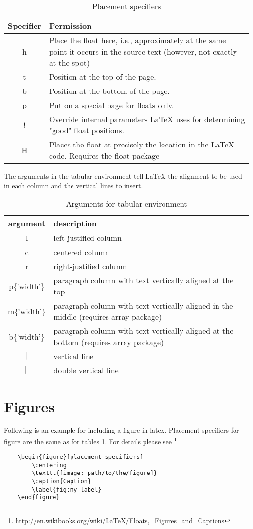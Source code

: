 \begin{table}[h]
\centering
\begin{tabular}{|c|p{6cm}|} \hline
Specifier	& Permission \\ \hline
h	 & Place the float here, i.e., approximately at the same point it  occurs in the source text (however, not exactly at the spot)\\ \hline
t &	Position at the top of the page. \\ \hline
b &	Position at the bottom of the page. \\ \hline
p &	Put on a special page for floats only. \\ \hline
! &	Override internal parameters LaTeX uses for determining "good" float positions.\\ \hline
H &	Places the float at precisely the location in the LaTeX code. Requires the float package \\ \hline
\end{tabular}
\caption{Placement specifiers}
\label{tab:placspec}
\end{table}
The  arguments in the tabular environment tell LaTeX the alignment to be used in each column and the vertical lines to insert.

\begin{table}[h]
\centering
\begin{tabular}{|c|p{6cm}|} \hline
 argument & description \\ \hline
 l &	left-justified column \\ \hline
c &	centered column \\ \hline
r &	right-justified column \\ \hline
p\{'width'\} &	paragraph column with text vertically aligned at the top\\ \hline
m\{'width'\}	 & paragraph column with text vertically aligned in  the middle (requires array package) \\ \hline
b\{'width'\} &	paragraph column with text vertically aligned at the bottom (requires array package) \\ \hline
$|$ &	vertical line \\ \hline
$||$ &	double vertical line \\ \hline
\end{tabular}
\caption{Arguments for tabular environment}
\label{tab:argumenttable}
\end{table}

\section{Figures}
Following is an example for including a figure in latex. Placement specifiers for figure are the same as for tables \ref{tab:placspec}.
For details please see \footnote{\url{http://en.wikibooks.org/wiki/LaTeX/Floats,_Figures_and_Captions}}
\begin{lstlisting}
    \begin{figure}[placement specifiers]
        \centering
        \texttt{[image: path/to/the/figure]}
        \caption{Caption}
        \label{fig:my_label}
    \end{figure}
\end{lstlisting}

